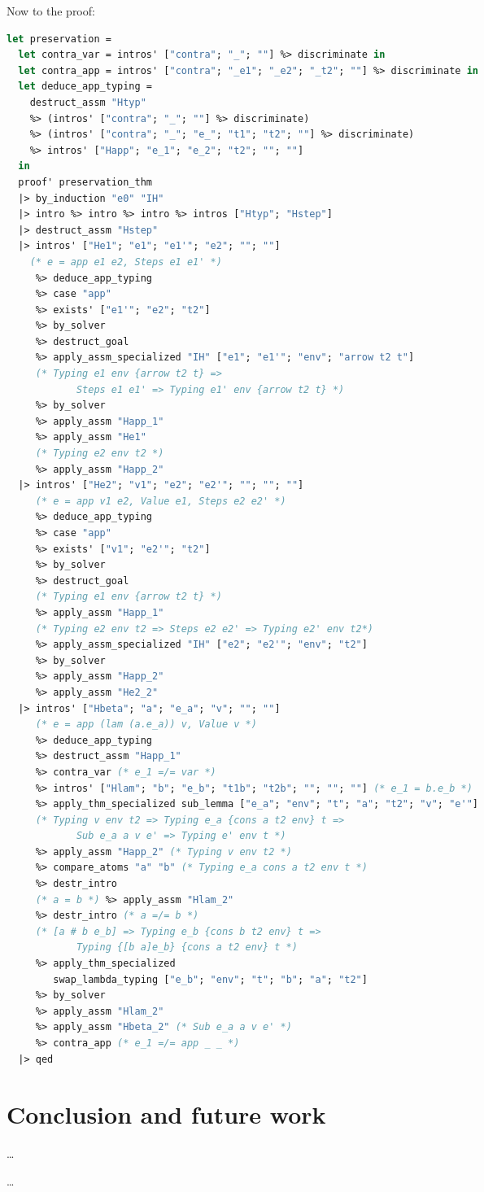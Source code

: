 \documentclass[english, mgr]{iithesis}
\begin{document}
Now to the proof:
\begin{lstlisting}[language=OCaml]
let preservation =
  let contra_var = intros' ["contra"; "_"; ""] %> discriminate in
  let contra_app = intros' ["contra"; "_e1"; "_e2"; "_t2"; ""] %> discriminate in
  let deduce_app_typing =
    destruct_assm "Htyp"
    %> (intros' ["contra"; "_"; ""] %> discriminate)
    %> (intros' ["contra"; "_"; "e_"; "t1"; "t2"; ""] %> discriminate)
    %> intros' ["Happ"; "e_1"; "e_2"; "t2"; ""; ""]
  in
  proof' preservation_thm
  |> by_induction "e0" "IH"
  |> intro %> intro %> intro %> intros ["Htyp"; "Hstep"]
  |> destruct_assm "Hstep"
  |> intros' ["He1"; "e1"; "e1'"; "e2"; ""; ""]
    (* e = app e1 e2, Steps e1 e1' *)
     %> deduce_app_typing
     %> case "app"
     %> exists' ["e1'"; "e2"; "t2"]
     %> by_solver
     %> destruct_goal
     %> apply_assm_specialized "IH" ["e1"; "e1'"; "env"; "arrow t2 t"]
     (* Typing e1 env {arrow t2 t} =>
            Steps e1 e1' => Typing e1' env {arrow t2 t} *)
     %> by_solver
     %> apply_assm "Happ_1"
     %> apply_assm "He1"
     (* Typing e2 env t2 *)
     %> apply_assm "Happ_2"
  |> intros' ["He2"; "v1"; "e2"; "e2'"; ""; ""; ""]
     (* e = app v1 e2, Value e1, Steps e2 e2' *)
     %> deduce_app_typing
     %> case "app"
     %> exists' ["v1"; "e2'"; "t2"]
     %> by_solver
     %> destruct_goal
     (* Typing e1 env {arrow t2 t} *)
     %> apply_assm "Happ_1"
     (* Typing e2 env t2 => Steps e2 e2' => Typing e2' env t2*)
     %> apply_assm_specialized "IH" ["e2"; "e2'"; "env"; "t2"]
     %> by_solver
     %> apply_assm "Happ_2"
     %> apply_assm "He2_2"
  |> intros' ["Hbeta"; "a"; "e_a"; "v"; ""; ""]
     (* e = app (lam (a.e_a)) v, Value v *)
     %> deduce_app_typing
     %> destruct_assm "Happ_1"
     %> contra_var (* e_1 =/= var *)
     %> intros' ["Hlam"; "b"; "e_b"; "t1b"; "t2b"; ""; ""; ""] (* e_1 = b.e_b *)
     %> apply_thm_specialized sub_lemma ["e_a"; "env"; "t"; "a"; "t2"; "v"; "e'"]
     (* Typing v env t2 => Typing e_a {cons a t2 env} t =>
            Sub e_a a v e' => Typing e' env t *)
     %> apply_assm "Happ_2" (* Typing v env t2 *)
     %> compare_atoms "a" "b" (* Typing e_a cons a t2 env t *)
     %> destr_intro
     (* a = b *) %> apply_assm "Hlam_2"
     %> destr_intro (* a =/= b *)
     (* [a # b e_b] => Typing e_b {cons b t2 env} t =>
            Typing {[b a]e_b} {cons a t2 env} t *)
     %> apply_thm_specialized
        swap_lambda_typing ["e_b"; "env"; "t"; "b"; "a"; "t2"]
     %> by_solver
     %> apply_assm "Hlam_2"
     %> apply_assm "Hbeta_2" (* Sub e_a a v e' *)
     %> contra_app (* e_1 =/= app _ _ *)
  |> qed
\end{lstlisting}


\chapter{Conclusion and future work}

\dots


\begin{thebibliography}{1}
 \ldots
\end{thebibliography}
\end{document}
